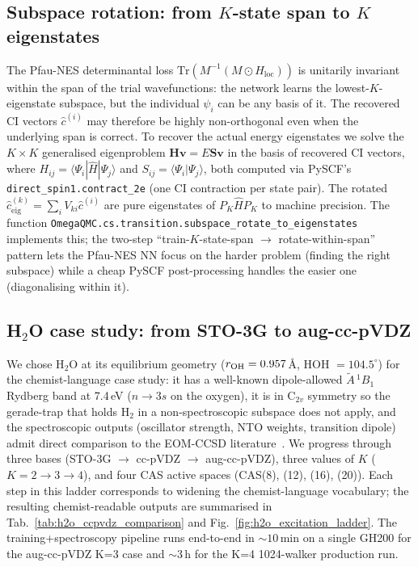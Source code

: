\documentclass[journal=jctcce,manuscript=suppinfo,layout=traditional]{achemso}
\begin{document}
\subsection{Subspace rotation: from $K$-state span to $K$ eigenstates}

The Pfau-NES determinantal loss
$\mathrm{Tr}(M^{-1}(M\!\odot\!H_{\mathrm{loc}}))$ is unitarily
invariant within the span of the trial wavefunctions: the network
learns the lowest-$K$-eigenstate subspace, but the individual $\psi_i$
can be any basis of it. The recovered CI vectors $\widehat{c}^{(i)}$
may therefore be highly non-orthogonal even when the underlying span
is correct. To recover the actual energy eigenstates we solve the
$K\times K$ generalised eigenproblem
$\mathbf{H}\mathbf{v} = E \mathbf{S}\mathbf{v}$ in the basis of
recovered CI vectors, where
$H_{ij} = \langle \Psi_i | \hat H | \Psi_j \rangle$ and
$S_{ij} = \langle \Psi_i | \Psi_j \rangle$, both computed via PySCF's
\texttt{direct\_spin1.contract\_2e} (one CI contraction per state
pair). The rotated
$\widehat{c}^{(k)}_{\mathrm{eig}} = \sum_i V_{ki} \widehat{c}^{(i)}$
are pure eigenstates of $P_K \hat H P_K$ to machine precision. The
function
\texttt{OmegaQMC.cs.transition.subspace\_rotate\_to\_eigenstates}
implements this; the two-step ``train-$K$-state-span $\to$
rotate-within-span'' pattern lets the Pfau-NES NN focus on the harder
problem (finding the right subspace) while a cheap PySCF
post-processing handles the easier one (diagonalising within it).

\subsection{H$_2$O case study: from STO-3G to aug-cc-pVDZ}
\label{sec:h2o_case_study}

We chose H$_2$O at its equilibrium geometry ($r_{\rm OH} = 0.957\,$\AA,
HOH $= 104.5^\circ$) for the chemist-language case study: it has a
well-known dipole-allowed $\tilde A\,^1B_1$ Rydberg band at 7.4\,eV
($n \to 3s$ on the oxygen), it is in C$_{2v}$ symmetry so the
gerade-trap that holds H$_2$ in a non-spectroscopic subspace does not
apply, and the spectroscopic outputs (oscillator strength, NTO
weights, transition dipole) admit direct comparison to the EOM-CCSD
literature~\cite{schreiber2008benchmarks}. We progress through three
bases (STO-3G $\to$ cc-pVDZ $\to$ aug-cc-pVDZ), three values of $K$
($K=2 \to 3 \to 4$), and four CAS active spaces (CAS(8), (12), (16),
(20)). Each step in this ladder corresponds to widening the
chemist-language vocabulary; the resulting chemist-readable outputs
are summarised in Tab.~\ref{tab:h2o_ccpvdz_comparison} and
Fig.~\ref{fig:h2o_excitation_ladder}. The training+spectroscopy
pipeline runs end-to-end in $\sim 10$\,min on a single GH200 for the
aug-cc-pVDZ K=3 case and $\sim 3$\,h for the K=4 1024-walker
production run.
\end{document}
